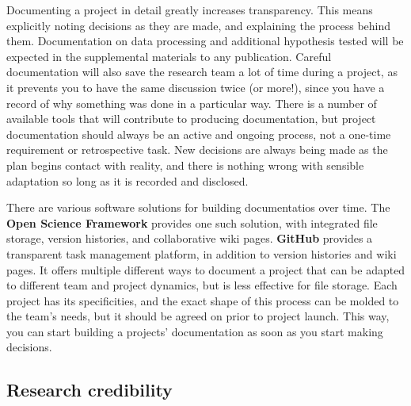 Documenting a project in detail greatly increases transparency.
This means explicitly noting decisions as they are made, and explaining the process behind them.
Documentation on data processing and additional hypothesis tested will be expected in the supplemental materials to any publication.
Careful documentation will also save the research team a lot of time during a project,
as it prevents you to have the same discussion twice (or more!),
since you have a record of why something was done in a particular way.
There is a number of available tools
that will contribute to producing documentation,
but project documentation should always be an active and ongoing process,
not a one-time requirement or retrospective task.
New decisions are always being made as the plan begins contact with reality,
and there is nothing wrong with sensible adaptation so long as it is recorded and disclosed.

There are various software solutions for building documentatios over time.
The \textbf{Open Science Framework} provides one such solution,
with integrated file storage, version histories, and collaborative wiki pages.
\textbf{GitHub} provides a transparent task management
platform,
in addition to version histories and wiki pages.
It offers multiple different ways to document a project that can be adapted to different team and project dynamics,
but is less effective for file storage.
Each project has its specificities,
and the exact shape of this process can be molded to the team's needs,
but it should be agreed on prior to project launch.
This way, you can start building a projects' documentation as soon as you start making decisions.

\subsection{Research credibility}

